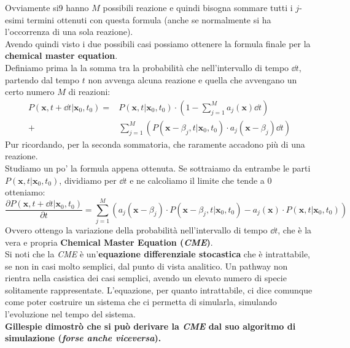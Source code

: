 \documentclass[a4paper,12pt, oneside]{book}
\begin{document}
Ovviamente si9 hanno $M$ possibili reazione e quindi bisogna sommare tutti i
$j$-esimi termini ottenuti con questa formula (anche se normalmente si ha
l'occorrenza di una sola reazione). \\
Avendo quindi visto i due possibili casi possiamo ottenere la formula finale per
la \textbf{chemical master equation}.\\
Definiamo prima la la somma tra la
probabilità che nell'intervallo di tempo $\dd{t}$, partendo dal tempo $t$ non
avvenga alcuna reazione e quella che avvengano un certo numero $M$ di
reazioni: 
\begin{align*}
  P(\mathbf{x},t+\dd{t}|\mathbf{x}_0,t_0)=&P(\mathbf{x},t|\mathbf{x}_0,t_0)
                                            \cdot
                                            \left(1-\sum_{j=1}^Ma_j(\mathbf{x})\dd{t}\right)\\
  +& \sum_{j=1}^M(P(\mathbf{x}-\beta_j,t|
     \mathbf{x}_0,t_0)\cdot a_j(\mathbf{x}-\beta_j)\dd{t})
\end{align*}
Pur ricordando, per la seconda sommatoria, che raramente accadono più di una
reazione.\\
Studiamo un po' la formula appena ottenuta. Se sottraiamo da entrambe le parti
$P(\mathbf{x},t|\mathbf{x}_0,t_0)$, dividiamo per $\dd{t}$ e ne calcoliamo il
limite che tende a 0 otteniamo:
{\small{\[\frac{\partial
    P(\mathbf{x},t+\dd{t}|\mathbf{x}_0,t_0)}{\partial t}=\sum_{j=1}^M\left(
 a_j(\mathbf{x}-\beta_j)\cdot
 P(\mathbf{x}-\beta_j,t|\mathbf{x}_0,t_0)-a_j(\mathbf{x})\cdot P(\mathbf{x},t|
 \mathbf{x}_0,t_0)\right)\]}}
Ovvero ottengo la variazione della probabilità nell'intervallo di tempo
$\dd{t}$, che è la vera e propria \textbf{Chemical Master Equation
  (\textit{CME})}.  \\
Si noti che la \textit{CME} è un'\textbf{equazione differenziale stocastica} che
è intrattabile, se non in casi molto semplici, dal punto di vista analitico. Un
pathway non rientra nella casistica dei casi semplici, avendo un elevato numero
di specie solitamente rappresentate. L'equazione, per quanto intrattabile, ci
dice comunque come poter costruire un sistema che ci permetta di simularla,
simulando l'evoluzione nel tempo del sistema.\\
\textbf{Gillespie dimostrò che si può derivare la \textit{CME} dal suo algoritmo
  di simulazione (\textit{forse anche viceversa}).}
\end{document}
